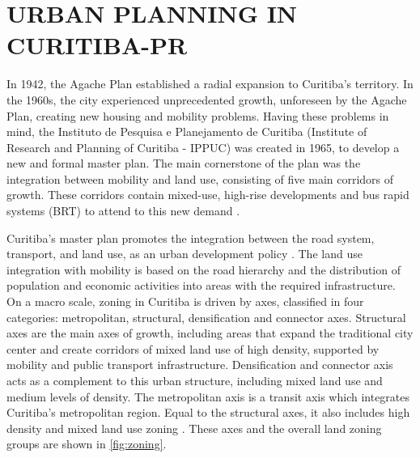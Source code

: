 \section{URBAN PLANNING IN CURITIBA-PR} \label{sec:cwb_be}

In 1942, the Agache Plan established a radial expansion to Curitiba's territory. In the 1960s, the city experienced unprecedented growth, unforeseen by the Agache Plan, creating new housing and mobility problems. Having these problems in mind, the Instituto de Pesquisa e Planejamento de Curitiba (Institute of Research and Planning of Curitiba - IPPUC) was created in 1965, to develop a new and formal master plan. The main cornerstone of the plan was the integration between mobility and land use, consisting of five main corridors of growth. These corridors contain mixed-use, high-rise developments and bus rapid systems (BRT) to attend to this new demand \cite{Rosario2016}. 

Curitiba's master plan promotes the integration between the road system, transport, and land use, as an urban development policy \cite{Curitiba2015}. The land use integration with mobility is based on the road hierarchy and the distribution of population and economic activities into areas with the required infrastructure. On a macro scale, zoning in Curitiba is driven by axes, classified in four categories: metropolitan, structural, densification and connector axes. Structural axes are the main axes of growth, including areas that expand the traditional city center and create corridors of mixed land use of high density, supported by mobility and public transport infrastructure. Densification and connector axis acts as a complement to this urban structure, including mixed land use and medium levels of density. The metropolitan axis is a transit axis which integrates Curitiba's metropolitan region. Equal to the structural axes, it also includes high density and mixed land use zoning \cite{Curitiba2019a}. These axes and the overall land zoning groups are shown in \autoref{fig:zoning}.

